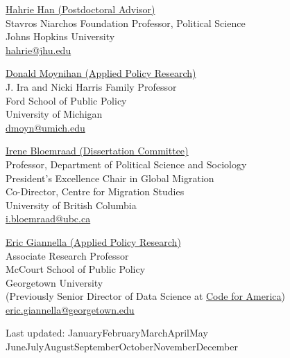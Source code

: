 \documentclass[10pt, letterpaper]{article}
\renewcommand{\today}{\ifcase \month \or January\or February\or March\or April\or May%
\or June\or July\or August\or September\or October\or November\or December\fi%
\space \number \year}
\begin{document}
\parbox[t]{0.475\textwidth}{\raggedright %
{\href{https://politicalscience.jhu.edu/directory/hahrie-han/}{Hahrie Han (Postdoctoral Advisor)}}\\
Stavros Niarchos Foundation Professor, Political Science\\
Johns Hopkins University\\ %
\href{mailto:hahrie@jhu.edu}{hahrie@jhu.edu} %
}
\hspace{0.04\textwidth}
\parbox[t]{0.475\textwidth}{\raggedright %
{\href{https://fordschool.umich.edu/faculty/don-moynihan}{Donald Moynihan (Applied Policy Research)}}\\
J. Ira and Nicki Harris Family Professor\\ 
Ford School of Public Policy\\
University of Michigan\\ %
\href{mailto:dmoyn@umich.edu}{dmoyn@umich.edu} %
}
\par\vspace{0.9\baselineskip}
\parbox[t]{0.475\textwidth}{\raggedright %
{\href{https://politics.ubc.ca/profile/irene-bloemraad/}{Irene Bloemraad (Dissertation Committee)}}\\
Professor, Department of Political Science and Sociology\\
President's Excellence Chair in Global Migration\\ 
Co-Director, Centre for Migration Studies\\
University of British Columbia\\
\href{mailto:i.bloemraad@ubc.ca}{i.bloemraad@ubc.ca} %
}
\hspace{0.04\textwidth}
\parbox[t]{0.475\textwidth}{\raggedright %
{\href{https://gufaculty360.georgetown.edu/s/contact/003UH000006T24bYAC/eric-giannella}{Eric Giannella (Applied Policy Research)}}\\
Associate Research Professor\\
McCourt School of Public Policy\\
Georgetown University\\
(Previously Senior Director of Data Science at \href{https://codeforamerica.org/people/eric-giannella/}{Code for America})\\
\href{mailto:eric.giannella@georgetown.edu}{eric.giannella@georgetown.edu}
}
\par\vspace{0.9\baselineskip}

\begin{center}
Last updated: \today    
\end{center}
\end{document}
